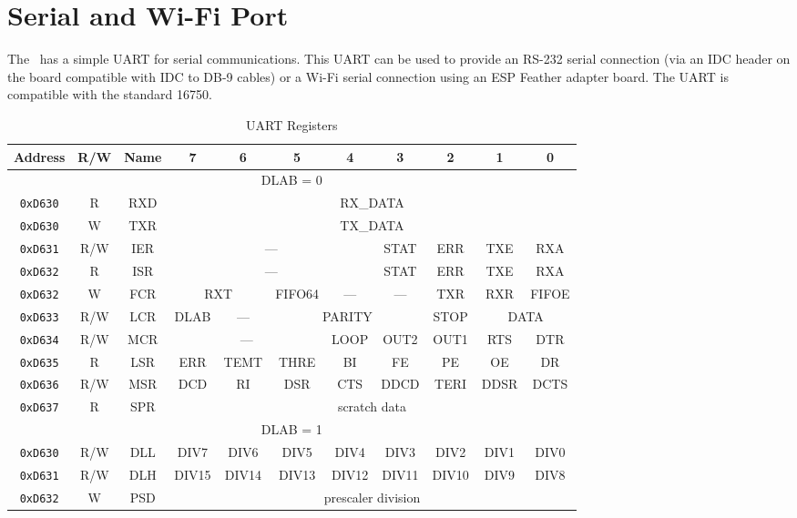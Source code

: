 \chapter{Serial and Wi-Fi Port}

The \jr\ has a simple UART for serial communications. This UART can be used to provide an RS-232 serial connection (via an IDC header on the board compatible with IDC to DB-9 cables) or a Wi-Fi serial connection using an ESP Feather adapter board. The UART is compatible with the standard 16750.

\begin{table}[ht]
    \begin{center}
        \begin{tabular}{|c|c|c|c|c|c|c|c|c|c|c|} \hline
            Address & R/W & Name & 7 & 6 & 5 & 4 & 3 & 2 & 1 & 0 \\\hline\hline
            \multicolumn{11}{|c|}{DLAB = 0} \\ \hline
            \verb+0xD630+ & R & RXD & \multicolumn{8}{|c|}{RX\_DATA} \\ \hline
            \verb+0xD630+ & W & TXR & \multicolumn{8}{|c|}{TX\_DATA} \\ \hline
            \verb+0xD631+ & R/W & IER & \multicolumn{4}{|c|}{---} & STAT & ERR & TXE & RXA \\ \hline
            \verb+0xD632+ & R & ISR & \multicolumn{4}{|c|}{---} & STAT & ERR & TXE & RXA \\ \hline
            \verb+0xD632+ & W & FCR & \multicolumn{2}{|c|}{RXT} & FIFO64 & --- & --- & TXR & RXR & FIFOE \\ \hline
            \verb+0xD633+ & R/W & LCR & DLAB & --- & \multicolumn{3}{|c|}{PARITY} & STOP & \multicolumn{2}{|c|}{DATA} \\ \hline
            \verb+0xD634+ & R/W & MCR & \multicolumn{3}{|c|}{---} & LOOP & OUT2 & OUT1 & RTS & DTR \\ \hline
            \verb+0xD635+ & R & LSR & ERR & TEMT & THRE & BI & FE & PE & OE & DR \\ \hline
            \verb+0xD636+ & R/W & MSR & DCD & RI & DSR & CTS & DDCD & TERI & DDSR & DCTS \\ \hline
            \verb+0xD637+ & R & SPR & \multicolumn{8}{|c|}{scratch data} \\ \hline\hline

            \multicolumn{11}{|c|}{DLAB = 1} \\ \hline
            \verb+0xD630+ & R/W & DLL & DIV7 & DIV6 & DIV5 & DIV4 & DIV3 & DIV2 & DIV1 & DIV0 \\ \hline
            \verb+0xD631+ & R/W & DLH & DIV15 & DIV14 & DIV13 & DIV12 & DIV11 & DIV10 & DIV9 & DIV8 \\ \hline
            \verb+0xD632+ & W & PSD & \multicolumn{8}{|c|}{prescaler division} \\ \hline
        \end{tabular}
    \end{center}
    \caption{UART Registers}
    \label{tab:uart_reg}
\end{table}

